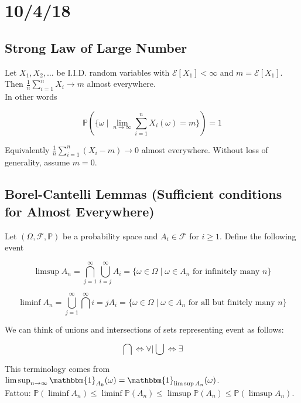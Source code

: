 \documentclass[english, course]{Notes}
\begin{document}
\section{10/4/18}

\subsection{Strong Law of Large Number}

\begin{theorem}
Let $X_1, X_2, \dots$ be I.I.D. random variables with $\mathcal{E}[X_1] < \infty$ and $m = \mathcal{E}[X_1]$. Then $\frac{1}{n}\sum_{i=1}^n X_i \to m$ almost everywhere.\\

In other words

\[\mathbb{P}(\{\omega \mid \lim_{n \to \infty} \sum_{i = 1}^n X_i(\omega) = m\}) = 1\]

Equivalently $\frac{1}{n} \sum_{i = 1}^n(X_i - m) \to 0$ almost everywhere. Without loss of generality, assume $m=0$.
\end{theorem}


\subsection{Borel-Cantelli Lemmas (Sufficient conditions for Almost Everywhere)}

Let $(\Omega, \mathcal{F}, \mathbb{P})$ be a probability space and $A_i \in \mathcal{F}$ for $i \geq 1$. Define the following event

\[\limsup A_n = \bigcap^\infty_{j = 1} \bigcup^\infty_{i=j} A_i = \{\omega \in \Omega \mid \omega \in A_n \text{ for infinitely many } n \}\]

\[\liminf A_n = \bigcup^\infty_{j = 1} \bigcap^\infty{i = j} A_i = \{\omega \in \Omega \mid \omega \in A_n \text{ for all but finitely many } n\}\]

We can think of unions and intersections of sets representing event as follows:

\[\bigcap \iff \forall \mid \bigcup \iff \exists\]

This terminology comes from $\limsup_{n \to \infty} \mathbbm{1}_{A_k}(\omega) = \mathbbm{1}_{\limsup A_n}(\omega)$.\\

Fattou: $\mathbb{P}(\liminf A_n) \leq \liminf \mathbb{P}(A_n) \leq \limsup \mathbb{P}(A_n) \leq \mathbb{P}(\limsup A_n)$.\\
\end{document}
